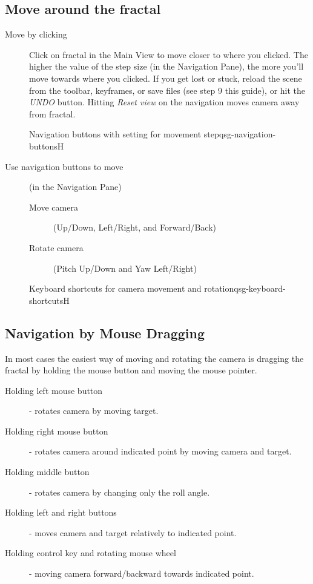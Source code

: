 \subsection{Move around the fractal}\label{qsg-move-around}
\begin{description}
	\item[Move by clicking] Click on fractal in the Main View to move closer to where you clicked. The higher the value of the step size (in the Navigation Pane), the more you’ll move towards where you clicked. If you get lost or stuck, reload the scene from the toolbar, keyframes, or save files (see step 9 this guide), or hit the \emph{UNDO} button. Hitting \emph{Reset view} on the navigation moves camera away from fractal.
	
	{Navigation buttons with setting for movement step}{qsg-navigation-buttons}{H}
	
    \item[Use navigation buttons to move] (in the Navigation Pane)
    
    \begin{description}
           \item[Move camera] (Up/Down, Left/Right, and Forward/Back)
    		\item[Rotate camera] (Pitch Up/Down and Yaw Left/Right)
    \end{description}

{Keyboard shortcuts for camera movement and rotation}{qsg-keyboard-shortcuts}{H}

\end{description}

\subsection{Navigation by Mouse Dragging}\label{qsg-mouse-dragging}

In most cases the easiest way of moving and rotating the camera is dragging the fractal by holding the mouse button and moving the mouse pointer.

\begin{description}
	\item[Holding left mouse button] - rotates camera by moving target.
	\item[Holding right mouse button] - rotates camera around indicated point by moving camera and target.
	\item[Holding middle button] - rotates camera by changing only the roll angle.
	\item[Holding left and right buttons] - moves camera and target relatively to indicated point.
	\item[Holding control key and rotating mouse wheel] - moving camera forward/backward towards indicated point.

\end{description}

